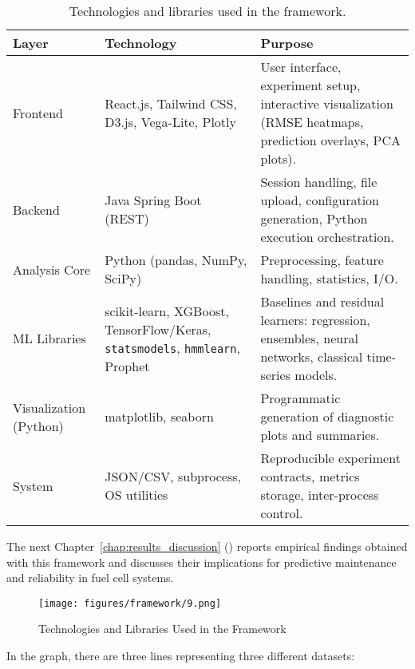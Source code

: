 \begin{table}[H]
\centering
\renewcommand{\arraystretch}{1.2}
\caption{Technologies and libraries used in the framework.}
\label{tab:tech_stack}
\begin{tabular}{p{2.0cm} p{4.1cm} p{6.8cm}}
\hline
\textbf{Layer} & \textbf{Technology} & \textbf{Purpose} \\
\hline
Frontend & React.js, Tailwind CSS, D3.js, Vega-Lite, Plotly &
User interface, experiment setup, interactive visualization (RMSE heatmaps, prediction overlays, PCA plots). \\
Backend & Java Spring Boot (REST) &
Session handling, file upload, configuration generation, Python execution orchestration. \\
Analysis Core & Python (pandas, NumPy, SciPy) &
Preprocessing, feature handling, statistics, I/O. \\
ML Libraries & scikit-learn, XGBoost, TensorFlow/Keras, \texttt{statsmodels}, \texttt{hmmlearn}, Prophet &
Baselines and residual learners: regression, ensembles, neural networks, classical time-series models. \\
Visualization (Python) & matplotlib, seaborn &
Programmatic generation of diagnostic plots and summaries. \\
System & JSON/CSV, subprocess, OS utilities &
Reproducible experiment contracts, metrics storage, inter-process control. \\
\hline
\end{tabular}
\end{table}
The next Chapter~\ref{chap:results_discussion} () reports empirical findings obtained with this framework and discusses their implications for predictive maintenance and reliability in fuel cell systems.
\begin{figure}[H]
 \texttt{[image: figures/framework/9.png]}
 \caption[Technologies and Libraries Used in the Framework]{Technologies and Libraries Used in the Framework}
 \label{fig:tech_for_the_system}
\end{figure}



In the graph, there are three lines representing three different datasets:

